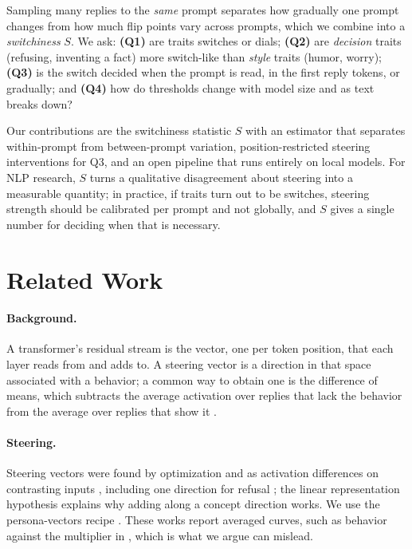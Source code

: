 \documentclass[11pt]{article}
\newcommand{\upd}[1]{{\color{blue}#1}}
\begin{document}
Sampling many replies to the \emph{same} prompt separates how gradually one prompt changes from how much flip points vary across prompts, which we combine into a \emph{switchiness} $S$. We ask: \textbf{(Q1)} are traits switches or dials; \textbf{(Q2)} are \emph{decision} traits (refusing, inventing a fact) more switch-like than \emph{style} traits (humor, worry); \textbf{(Q3)} is the switch decided when the prompt is read, in the first reply tokens, or gradually; and \textbf{(Q4)} how do thresholds change with model size and as text breaks down?

\upd{Our contributions are the switchiness statistic $S$ with an estimator that
separates within-prompt from between-prompt variation, position-restricted
steering interventions for Q3, and an open pipeline that runs entirely on local
models. For NLP research, $S$ turns a qualitative disagreement about steering
into a measurable quantity; in practice, if traits turn out to be switches,
steering strength should be calibrated per prompt and not globally, and $S$
gives a single number for deciding when that is necessary.}

\section{Related Work}

\upd{\paragraph{Background.} A transformer's residual stream is the vector, one
per token position, that each layer reads from and adds to. A steering vector is
a direction in that space associated with a behavior; a common way to obtain one
is the difference of means, which subtracts the average activation over replies
that lack the behavior from the average over replies that show it
\cite{chen2025persona}.}

\paragraph{Steering.} Steering vectors were found by optimization \cite{subramani2022latent} and as activation differences on contrasting inputs \cite{turner2023actadd,rimsky2024caa,zou2023repe,li2023iti}, including one direction for refusal \cite{arditi2024refusal}; the linear representation hypothesis \cite{park2024linear} explains why adding along a concept direction works. We use the persona-vectors recipe \cite{chen2025persona}. These works report averaged curves, such as behavior against the multiplier in \citet{rimsky2024caa}, which is what we argue can mislead.
\end{document}
